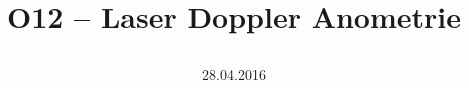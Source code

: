 \title{%
    \textbf{%
        \vspace{50mm} \\ \Huge{O12 -- Laser Doppler Anometrie}
    } \\
	\date{28.04.2016}
}
